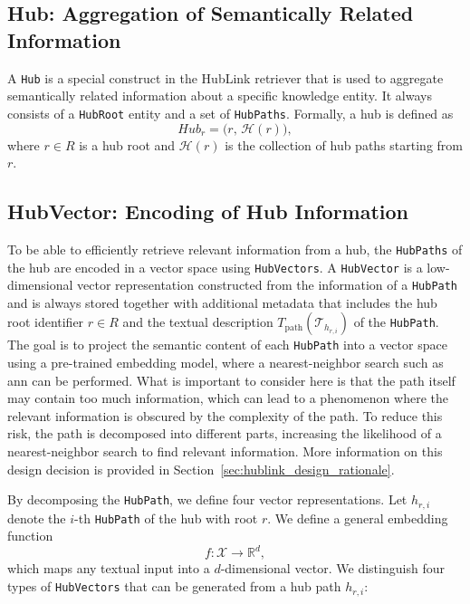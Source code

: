 \subsection{Hub: Aggregation of Semantically Related Information}

A \texttt{Hub} is a special construct in the HubLink retriever that is used to aggregate semantically related information about a specific knowledge entity. It always consists of a \texttt{HubRoot} entity and a set of \texttt{HubPaths}. Formally, a hub is defined as
\[
Hub_r = \bigl( r,\, \mathcal{H}(r) \bigr),
\]
where \(r \in R\) is a hub root and \(\mathcal{H}(r)\) is the collection of hub paths starting from \(r\).

\subsection{HubVector: Encoding of Hub Information}
\label{sec:hublink_hubvector_definition}

To be able to efficiently retrieve relevant information from a hub, the \texttt{HubPaths} of the hub are encoded in a vector space using \texttt{HubVectors}. A \texttt{HubVector} is a low-dimensional vector representation constructed from the information of a \texttt{HubPath} and is always stored together with additional metadata that includes the hub root identifier \(r \in R\) and the textual description $T_{\text{path}}(\mathcal{T}_{h_{r,i}})$ of the \texttt{HubPath}. The goal is to project the semantic content of each \texttt{HubPath} into a vector space using a pre-trained embedding model, where a nearest-neighbor search such as \gls{ann} can be performed. What is important to consider here is that the path itself may contain too much information, which can lead to a phenomenon where the relevant information is obscured by the complexity of the path. To reduce this risk, the path is decomposed into different parts, increasing the likelihood of a nearest-neighbor search to find relevant information. More information on this design decision is provided in Section~\ref{sec:hublink_design_rationale}. 

By decomposing the \texttt{HubPath}, we define four vector representations. Let \(h_{r,i}\) denote the \(i\)-th \texttt{HubPath} of the hub with root \(r\). We define a general embedding function
\[
f: \mathcal{X} \to \mathbb{R}^d,
\]
which maps any textual input into a \(d\)-dimensional vector. We distinguish four types of \texttt{HubVectors} that can be generated from a hub path \(h_{r,i}\):


